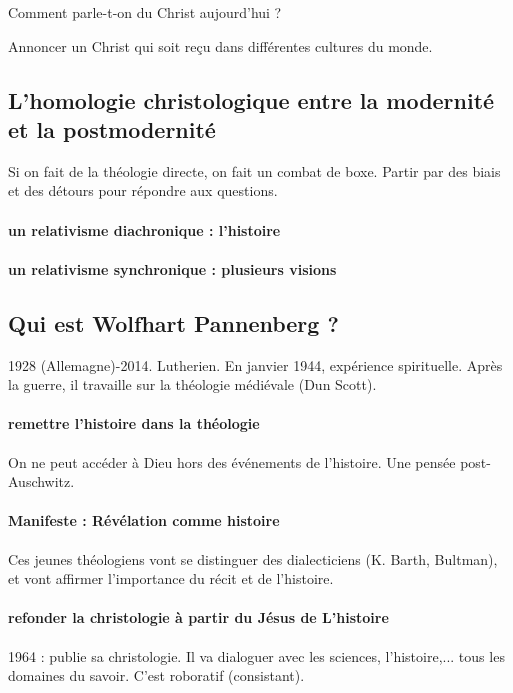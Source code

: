 Comment parle-t-on du Christ aujourd'hui ? 

\begin{Prop}

Annoncer un Christ qui soit reçu dans différentes cultures du monde. 
\end{Prop}
\subsection{L’homologie christologique entre la modernité et la postmodernité}

Si on fait de la théologie directe, on fait un combat de boxe. Partir par des biais et des détours pour répondre aux questions. 

\paragraph{un relativisme diachronique : l'histoire}
\paragraph{un relativisme synchronique : plusieurs visions}



\subsection{Qui est Wolfhart Pannenberg ?}
 1928 (Allemagne)-2014. Lutherien.
 En janvier 1944, expérience spirituelle. Après la guerre, il travaille sur la théologie médiévale (Dun Scott). 

 \paragraph{remettre l'histoire dans la théologie} On ne peut accéder à Dieu hors des événements de l'histoire. Une pensée post-Auschwitz. 

 \paragraph{Manifeste : Révélation comme histoire} Ces jeunes théologiens vont se distinguer des dialecticiens (K. Barth, Bultman), et vont affirmer l'importance du récit et de l'histoire. 

\paragraph{refonder la christologie à partir du Jésus de L'histoire} 1964 : publie sa christologie. Il va dialoguer avec les sciences, l'histoire,... tous les domaines du savoir. C'est roboratif (consistant). 

